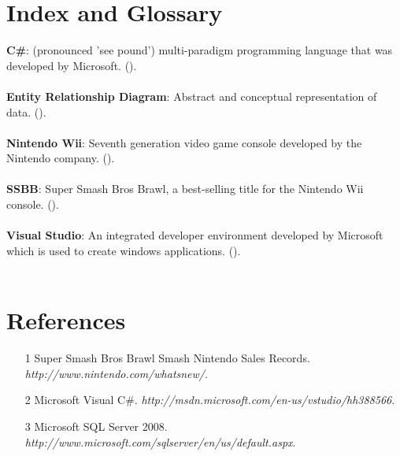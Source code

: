 \documentclass{article}
\begin{document}
\section{Index and Glossary}
\textbf{C\#}: (pronounced 'see pound') multi-paradigm programming language that was developed by Microsoft. (\pageref{csharp}).\\ \\
\textbf{Entity Relationship Diagram}: Abstract and conceptual representation of data. (\pageref{erd}).\\ \\
\textbf{Nintendo Wii}: Seventh generation video game console developed by the Nintendo company. (\pageref{nwii}).\\ \\
\textbf{SSBB}: Super Smash Bros Brawl, a best-selling title for the Nintendo Wii console. (\pageref{ssbb}).\\ \\
\textbf{Visual Studio}: An integrated developer environment developed by Microsoft which is used to create windows applications. (\pageref{vstudio}).\\ \\


\section{References}
\hangindent=1.4cm
\begin{itemize}
\item[1] Super Smash Bros Brawl Smash Nintendo Sales Records. \emph{http://www.nintendo.com/whatsnew/}.
\item[2] Microsoft Visual C\#. \emph{http://msdn.microsoft.com/en-us/vstudio/hh388566}.
\item[3] Microsoft SQL Server 2008. \emph{http://www.microsoft.com/sqlserver/en/us/default.aspx}.
\end{itemize}
\end{document}
